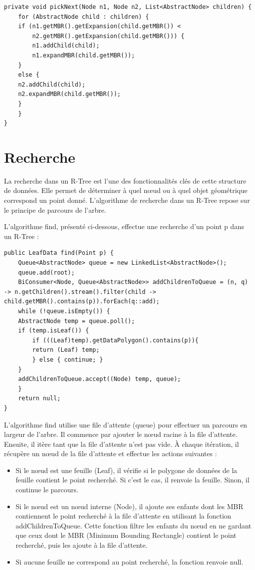 \documentclass {article}
\begin{document}
\begin{verbatim}
private void pickNext(Node n1, Node n2, List<AbstractNode> children) {
    for (AbstractNode child : children) {
	if (n1.getMBR().getExpansion(child.getMBR()) < 
		n2.getMBR().getExpansion(child.getMBR())) {
	    n1.addChild(child);
	    n1.expandMBR(child.getMBR());
	} 
	else {
	n2.addChild(child);
	n2.expandMBR(child.getMBR());
	}
    }
}
\end{verbatim}

\section {Recherche}\label{recherche}



La recherche dans un R-Tree est l'une des fonctionnalités clés de cette structure de données. 
Elle permet de déterminer à quel nœud ou à quel objet géométrique correspond un point donné. 
L'algorithme de recherche dans un R-Tree repose sur le principe de parcours de l'arbre.

L'algorithme find, présenté ci-dessous, effectue une recherche d'un point p dans un R-Tree :


\begin{verbatim}
public LeafData find(Point p) {
    Queue<AbstractNode> queue = new LinkedList<AbstractNode>();
    queue.add(root);
    BiConsumer<Node, Queue<AbstractNode>> addChildrenToQueue = (n, q) -> n.getChildren().stream().filter(child -> child.getMBR().contains(p)).forEach(q::add);
    while (!queue.isEmpty()) {
	AbstractNode temp = queue.poll();
	if (temp.isLeaf()) {
	    if (((Leaf)temp).getDataPolygon().contains(p)){
		return (Leaf) temp;
	    } else { continue; }
	}
	addChildrenToQueue.accept((Node) temp, queue);
    }
    return null;
}
\end{verbatim}

L'algorithme find utilise une file d'attente (queue) pour effectuer un parcours en largeur de l'arbre. 
Il commence par ajouter le nœud racine à la file d'attente. Ensuite, il itère tant que la file d'attente 
n'est pas vide. À chaque itération, il récupère un nœud de la file d'attente et effectue les actions suivantes :

\begin{itemize}
    \item Si le nœud est une feuille (Leaf), il vérifie si le polygone de données de la feuille contient le point 
	recherché. Si c'est le cas, il renvoie la feuille. 
	Sinon, il continue le parcours.
    \item Si le nœud est un nœud interne (Node), il ajoute ses enfants dont les MBR contiennent le point 
	recherché à la file d'attente en utilisant la fonction addChildrenToQueue. 
	Cette fonction filtre les enfants du nœud en ne gardant que ceux dont le MBR (Minimum Bounding Rectangle) 
	contient le point recherché, puis les ajoute à la file d'attente.
    \item Si aucune feuille ne correspond au point recherché, la fonction renvoie null.
\end{itemize}
\end{document}
